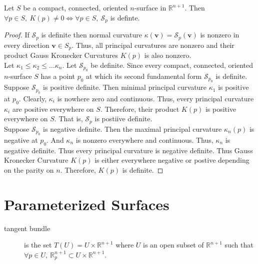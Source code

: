 \begin{theorem}
	Let $S$ be a compact, connected, oriented $n$-surface in $\mathbb{R}^{n+1}$.
	Then $\forall p \in S,\ K(p) \ne 0 \iff \forall p \in S,\ \mathscr{S}_p$ is definte.
\end{theorem}
\begin{proof}
	If $\mathscr{S}_p$ is definite then normal curvature $\kappa(\mathbf{v}) = \mathscr{S}_p(\mathbf{v})$ is nonzero in every direction $\mathbf{v} \in S_p$.
	Thus, all principal curvatures are nonzero and their product Gauss Kronecker Curvatures $K(p)$ is also nonzero.\\


	Let $\kappa_1 \le \kappa_2 \le \dots \kappa_n$.
	Let $\mathscr{S}_{p_0}$ be definite.
	Since every compact, connected, oriented $n$-surface $S$ has a point $p_0$ at which its second fundamental form $\mathscr{S}_{p_0}$ is definite.
	Suppose $\mathscr{S}_{p_0}$ is positive definite.
	Then minimal principal curvature $\kappa_1$ is positive at $p_0$.
	Clearly, $\kappa_i$ is nowhere zero and continuous.
	Thus, every principal curvature $\kappa_i$ are positive everywhere on $S$.
	Therefore, their product $K(p)$ is positive everywhere on $S$.
	That is, $\mathscr{S}_p$ is postiive definite.\\


	Suppose $\mathscr{S}_{p_0}$ is negative definite.
	Then the maximal principal curvature $\kappa_n(p)$ is negative at $p_0$.
	And $\kappa_n$ is nonzero everywhere and continuous.
	Thus, $\kappa_n$ is negative definite.
	Thus every principal curvature is negative definite.
	Thus Gauss Kronecker Curvature $K(p)$ is either everywhere negative or postive depending on the parity on $n$.
	Therefore, $K(p)$ is definite.
\end{proof}
\setcounter{section}{13}
\section{Parameterized Surfaces}
\begin{description}
	\item[tangent bundle] is the set $T(U) = U \times \mathbb{R}^{n+1}$ where $U$ is an open subset of $\mathbb{R}^{n+1}$ such that $\forall p \in U,\ \mathbb{R}_p^{n+1} \subset U \times \mathbb{R}^{n+1}$.
\end{description}

